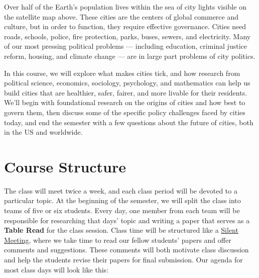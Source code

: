 \documentclass[11pt, letterpaper]{article}
\begin{document}
\noindent Over half of the Earth's population lives within the sea of city lights visible on the satellite map above. These cities are the centers of global commerce and culture, but in order to function, they require effective governance. Cities need roads, schools, police, fire protection, parks, buses, sewers, and electricity. Many of our most pressing political problems --- including education, criminal justice reform, housing, and climate change --- are in large part problems of city politics.

In this course, we will explore what makes cities tick, and how research from political science, economics, sociology, psychology, and mathematics can help us build cities that are healthier, safer, fairer, and more livable for their residents. We'll begin with foundational research on the origins of cities and how best to govern them, then discuss some of the specific policy challenges faced by cities today, and end the semester with a few questions about the future of cities, both in the US and worldwide.



\section*{Course Structure}

The class will meet twice a week, and each class period will be devoted to a particular topic. At the beginning of the semester, we will split the class into teams of five or six students. Every day, one member from each team will be responsible for researching that days' topic and writing a paper that serves as a \textbf{Table Read} for the class session. Class time will be structured like a  \href{https://medium.com/swlh/the-silent-meeting-manifesto-v1-189e9e3487eb}{Silent Meeting}, where we take time to read our fellow students' papers and offer comments and suggestions. These comments will both motivate class discussion and help the students revise their papers for final submission. Our agenda for most class days will look like this:
\end{document}
